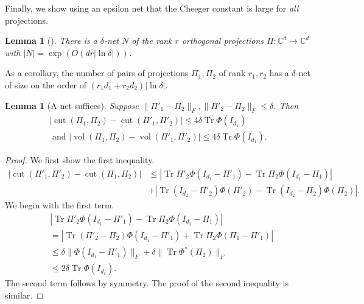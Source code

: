 \documentclass[aos]{imsart}
\newtheorem{lemma}[theorem]{Lemma}
\theoremstyle{definition}
\numberwithin{equation}{section}
\DeclareMathOperator{\vol}{vol}
\DeclareMathOperator{\cut}{cut}
\DeclareMathOperator{\tr}{Tr}
\newcommand{\C}{{\mathbb{C}}}
\begin{document}
\begin{appendix}
Finally, we show using an epsilon net that the Cheeger constant is large for \emph{all} projections.
\begin{lemma}[\cite{FM20}]\label{lem:net} There is a $\delta$-net $N$ of the rank $r$ orthogonal projections $\Pi: \C^d \to \C^d$ with $|N| = \exp(O(d r |\ln \delta|))$.
\end{lemma}
As a corollary, the number of pairs of projections $\Pi_1, \Pi_2$ of rank $r_1, r_2$ has a $\delta$-net of size on the order of $(r_1 d_1 + r_2 d_2) |\ln \delta|$.

\begin{lemma}[A net suffices]\label{lem:net-suffices}
Suppose $\|\Pi'_1 -\Pi_2\|_F, \|\Pi'_2 - \Pi_2\|_F \leq \delta$. Then
\begin{align*} |\cut(\Pi_1, \Pi_2) - \cut(\Pi'_1, \Pi'_2)| \leq4\delta \tr \Phi(I_{d_1})\\
\textrm{ and }|\vol(\Pi_1, \Pi_2) - \vol(\Pi'_1, \Pi'_2)| \leq 4\delta \tr \Phi(I_{d_1}).
\end{align*}
\end{lemma}
\begin{proof}
We first show the first inequality.
\begin{align*}|\cut(\Pi'_1, \Pi'_2) - \cut(\Pi_1, \Pi_2)| & \leq |\tr \Pi'_2 \Phi(I_{d_1} - \Pi'_1) - \tr \Pi_2 \Phi(I_{d_1} - \Pi_1)|\\
&  + |\tr (I_{d_2} - \Pi'_2) \Phi(\Pi'_2) - \tr (I_{d_2} - \Pi_2) \Phi(\Pi_2)|.
\end{align*}
We begin with the first term.
\begin{align*}&|\tr \Pi'_2 \Phi(I_{d_1} - \Pi'_1) - \tr \Pi_2 \Phi(I_{d_1} - \Pi_1)|\\
&= |\tr (\Pi'_2 - \Pi_2) \Phi(I_{d_1} - \Pi'_1) + \tr \Pi_2 \Phi(\Pi_1 - \Pi'_1)|\\
&\leq \delta\| \Phi(I_{d_1} - \Pi'_1)\|_F + \delta\| \tr \Phi^*(\Pi_2)\|_F\\
& \leq 2 \delta \tr \Phi(I_{d_1}).
\end{align*}
The second term follows by symmetry. The proof of the second inequality is similar.
\end{proof}


\end{appendix}
\end{document}
